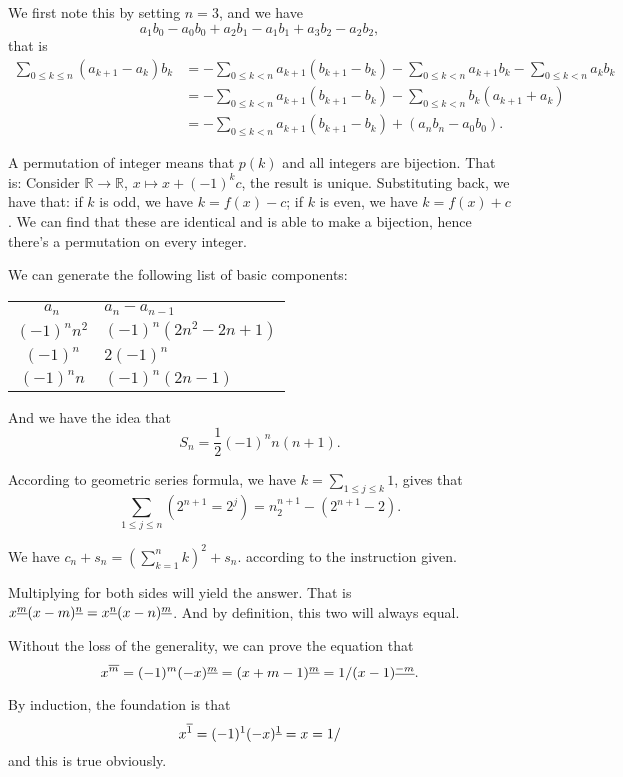  We first note this by setting $n = 3$, and we have 
\[
    a_1b_0-a_0b_0+a_2b_1-a_1b_1+a_3b_2-a_2b_2,
\]
that is 
\begin{align*}
    \sum_{0\leq k\leq n}^{} (a_{k+1}-a_k)b_k &= 
    -\sum_{0\leq k<n}^{}a_{k+1} (b_{k+1}-b_k)-\sum_{0\leq k<n}^{} a_{k+1}b_k
    -\sum_{0\leq k<n}^{} a_kb_k\\
    &= -\sum_{0\leq k<n}^{}a_{k+1}(b_{k+1}-b_k) - 
      \sum_{0\leq k<n}^{} b_k (a_{k+1} + a_k)\\
    &=  -\sum_{0\leq k<n}^{}a_{k+1}(b_{k+1}-b_k) + (a_n b_n - a_0b_0). 
\end{align*}

 A permutation of integer means that $p(k)$ and all integers 
are bijection. That is: Consider $\mathbb R \to \mathbb R$, $x\mapsto x+(-1)^kc$, the result is 
unique. Substituting back, we have that: if $k$ is odd, we have $k=f(x)-c$; 
if $ k$ is even, we have $k=f(x)+c$. We can find that these are identical
and is able to make a bijection, hence there's a permutation on every
integer. 


 We can generate the following list of basic components: 
\begin{tabular}{c|l}
    $a_n$ & $a_n-a_{n-1}$ \\
    $(-1)^nn^2$ & $(-1)^n(2n^2 -2n+1)$\\
    $(-1)^n$ & $2(-1)^n$ \\
    $(-1)^nn$ & $(-1)^n(2n-1)$
\end{tabular}

And we have the idea that 
\[
    S_n = \frac{1}{2}(-1)^n n(n+1). 
\]

 According to geometric series formula, we have 
$k=\sum_{1\leq j\leq k}^{}1$, gives that 
\[
    \sum_{1\leq j\leq n}^{}(2^{n+1} =2^j)=n_2^{n+1}-(2^{n+1}-2).
\]

 We have $c_n + s_n = \left(\sum_{k=1}^{n}k\right)^2+s_n.$ 
according to the instruction given. 

 Multiplying for both sides will yield the answer. 
That is ${x^{\underline{m}}}{(x-m)^{\underline{n}}}={x^{\underline{n}}}{(x-n)^{\underline{m}}}$. And 
by definition, this two will always equal. 

 Without the loss of the generality, we can prove the 
equation that 
\[
    x^{\overline{m}} = (-1)^m (-x)^{\underline{m}} = (x+m-1)^{\underline{m}} = 1/(x-1)^{\underline{-m}}.
\]

By induction, the foundation is that 
\[
    x^{\overline{1}} = (-1)^1 (-x)^{\underline{1}} = x = 1/
\]
and this is true obviously. 

